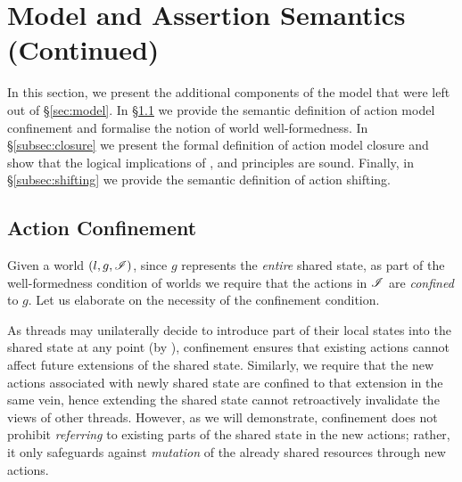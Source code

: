 \section{\colosl Model and Assertion Semantics (Continued)}\label{sec:model-continued}
In this section, we present the additional components of the \colosl model that were left out of \S\ref{sec:model}. In \S\ref{subsec:confinement} we provide the semantic definition of action model confinement and formalise the notion of world well-formedness. In \S\ref{subsec:closure} we present the formal definition of action model closure and show that the logical implications of \copyRule, \forgetRule and \mergeRule principles are sound. Finally, in \S\ref{subsec:shifting} we provide the semantic definition of action shifting. 
%
%
\subsection{Action Confinement}\label{subsec:confinement}
Given a world $(l, g, \mathscr{I})$, since $g$ represents the \emph{entire} shared state, as part of the well-formedness condition of worlds we require that the actions in $\mathscr{I}$ are \emph{confined} to $g$.  
Let us elaborate on the necessity of the confinement condition.

As threads may unilaterally decide to introduce part of their local states into the shared state at any point (by \extendRule), confinement ensures that existing actions cannot affect future extensions of the shared state. Similarly, we require that the new actions associated with newly shared state are confined to that extension in the same vein, hence extending the shared state cannot retroactively invalidate the views of other threads. However, as we will demonstrate, confinement does not prohibit \emph{referring} to existing parts of the shared state in the new actions; rather, it only safeguards against \emph{mutation} of the already shared resources through new actions.

